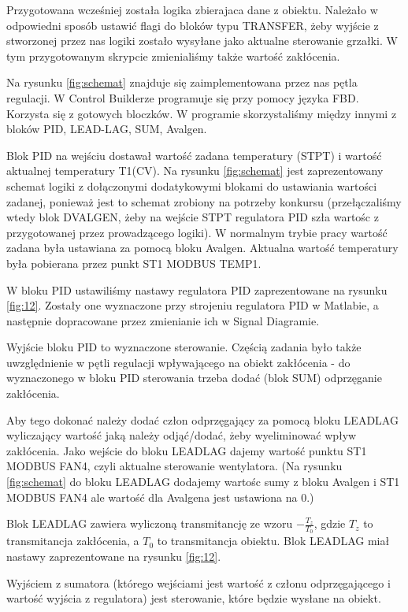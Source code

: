 \documentclass[12pt, a4paper]{article}
\begin{document}
Przygotowana wcześniej została logika zbierajaca dane z obiektu. Należało w odpowiedni sposób ustawić flagi do bloków typu TRANSFER, żeby wyjście z stworzonej przez nas logiki zostało wysyłane jako aktualne sterowanie grzałki. W tym przygotowanym skrypcie zmienialiśmy także wartość zakłócenia.

Na rysunku \ref{fig:schemat} znajduje się zaimplementowana przez nas pętla regulacji. W Control Builderze programuje się przy pomocy języka FBD. Korzysta się z gotowych bloczków. W programie skorzystaliśmy między innymi z bloków PID, LEAD-LAG, SUM, Avalgen.

Blok PID na wejściu dostawał wartość zadana temperatury (STPT) i wartość aktualnej temperatury T1(CV).  Na rysunku \ref{fig:schemat} jest zaprezentowany schemat logiki z dołączonymi dodatykowymi blokami do ustawiania wartości zadanej, ponieważ jest to schemat zrobiony na potrzeby konkursu (przełączaliśmy wtedy blok DVALGEN, żeby na wejście STPT regulatora PID szła wartośc z przygotowanej przez prowadzącego logiki). W normalnym trybie pracy wartość zadana była ustawiana za pomocą bloku Avalgen.
Aktualna wartość temperatury była pobierana przez punkt ST1 MODBUS TEMP1.

W bloku PID ustawiliśmy nastawy regulatora PID zaprezentowane na rysunku  \ref{fig:12}. Zostały one wyznaczone przy strojeniu regulatora PID w Matlabie, a następnie dopracowane przez zmienianie ich w Signal Diagramie.

Wyjście bloku PID to wyznaczone sterowanie. Częścią zadania było także uwzględnienie w pętli regulacji wpływającego na obiekt   zakłócenia - do wyznaczonego w bloku PID sterowania trzeba dodać (blok SUM) odprzęganie zakłócenia.

Aby tego dokonać należy dodać człon odprzęgający za pomocą bloku LEADLAG wyliczający wartość jaką należy odjąć/dodać, żeby wyeliminować wpływ zakłócenia. Jako wejście do bloku LEADLAG dajemy wartość punktu ST1 MODBUS FAN4, czyli aktualne sterowanie wentylatora. (Na rysunku \ref{fig:schemat} do bloku LEADLAG dodajemy wartośc sumy z bloku Avalgen i ST1 MODBUS FAN4 ale wartość dla Avalgena jest ustawiona na 0.) 

Blok LEADLAG zawiera wyliczoną transmitancję ze wzoru $-\frac{T_z}{T_0}$, gdzie $T_z$ to transmitancja zakłócenia, a $T_0$ to transmitancja obiektu. Blok LEADLAG miał nastawy zaprezentowane na rysunku \ref{fig:12}.

Wyjściem z sumatora (którego wejściami jest wartość z członu odprzęgającego i wartość wyjścia z regulatora) jest sterowanie, które będzie wysłane na obiekt.
\end{document}
